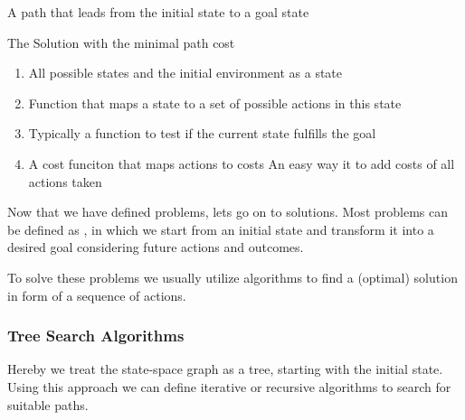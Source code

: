 \documentclass[
../../EiKI_Summary.tex,
]
{subfiles}
\begin{document}
\begin{defbox}
    [Solution]
    A path that leads from the initial state to a goal state
\end{defbox}

\begin{defbox}
    The Solution with the minimal path cost
\end{defbox}

\begin{enumerate}
    \item {} 
    \subitem All possible states and the initial environment as a state
    \item {}
    \subitem Function that maps a state to a set of possible actions in this state
    \item {}
    \subitem Typically a function to test if the current state fulfills the goal
    \item {} 
    \subitem A cost funciton that maps actions to costs
    \subitem An easy way it to add costs of all actions taken
\end{enumerate}

Now that we have defined problems, lets go on to solutions. Most problems can be defined as , in which we start from an initial state and transform it into a desired goal considering future actions and outcomes. 

To solve these problems we usually utilize  algorithms to find a (optimal) solution in form of a sequence of actions.

\subsubsection{Tree Search Algorithms}
Hereby we treat the state-space graph as a tree, starting with the initial state. Using this approach we can define iterative or recursive algorithms to search for suitable paths.
\end{document}
